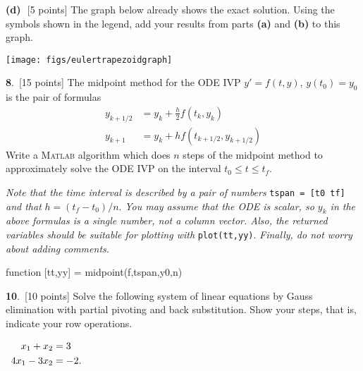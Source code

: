 \documentclass[11pt]{amsart}
\newcommand{\prob}[1]{\bigskip\noindent\large\textbf{#1}.\,\normalsize }
\newcommand{\epart}[1]{\medskip\noindent\textbf{(#1)}\,\, }
\newcommand{\pts}[1]{\scriptsize [#1 points] \normalsize}
\newcommand{\Matlab}{\textsc{Matlab}\xspace}
\begin{document}
\epart{d} \pts{5}  The graph below already shows the exact solution.  Using the symbols shown in the legend, add your results from parts \textbf{(a)} and \textbf{(b)} to this graph.

\bigskip\bigskip
\begin{center}
\texttt{[image: figs/eulertrapezoidgraph]}
\end{center}


\newpage
\prob{8} \pts{15}  The midpoint method for the ODE IVP $y'=f(t,y)$, $y(t_0)=y_0$ is the pair of formulas
\begin{align*}
y_{k+1/2} &= y_k + \frac{h}{2} f(t_k,y_k) \\
y_{k+1} &= y_k + h f(t_{k+1/2},y_{k+1/2})
\end{align*}
Write a \Matlab algorithm which does $n$ steps of the midpoint method to approximately solve the ODE IVP on the interval $t_0 \le t \le t_f$.

\emph{Note that the time interval is described by a pair of numbers} \texttt{tspan = [t0 tf]} \emph{and that} $h=(t_f-t_0)/n$.  \emph{You may assume that the ODE is scalar, so $y_k$ in the above formulas is a single number, not a column vector.  Also, the returned variables should be suitable for plotting with} \texttt{plot(tt,yy)}. \emph{Finally, do not worry about adding comments.}

\medskip
\begin{mVerb}
function [tt,yy] = midpoint(f,tspan,y0,n)
































\end{mVerb}
\vfill

\newpage
\prob{10}  \pts{10}  Solve the following system of linear equations by Gauss elimination with partial pivoting and back substitution.  Show your steps, that is, indicate your row operations.

\begin{align*}
  x_1 +   x_2 &= 3 \hspace{4.0in} \\
4 x_1 - 3 x_2 &= -2.
\end{align*}
\vfill
\end{document}
